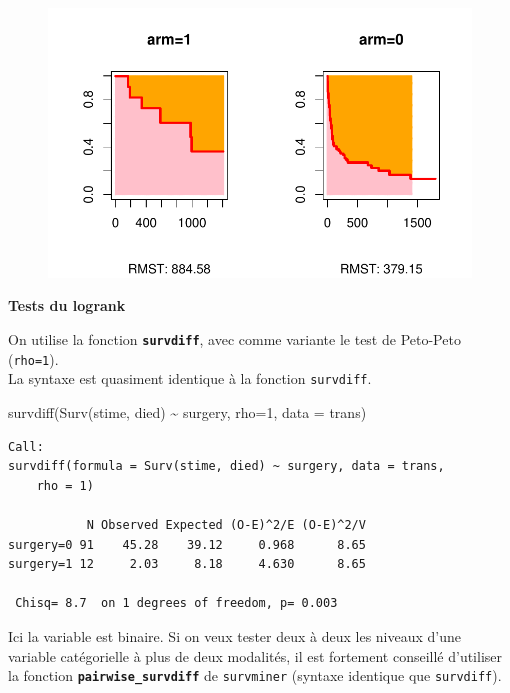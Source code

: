 \documentclass[
  12pt,
  letterpaper,
  DIV=11,
  numbers=noendperiod,
  onepage,
  openany]{scrreprt}
\newenvironment{Shaded}{\begin{snugshade}}{\end{snugshade}}
\newcommand{\AttributeTok}[1]{\textcolor[rgb]{0.80,0.80,0.80}{#1}}
\newcommand{\DecValTok}[1]{\textcolor[rgb]{0.86,0.86,0.80}{#1}}
\newcommand{\FunctionTok}[1]{\textcolor[rgb]{0.94,0.94,0.56}{#1}}
\newcommand{\NormalTok}[1]{\textcolor[rgb]{0.80,0.80,0.80}{#1}}
\newcommand{\SpecialCharTok}[1]{\textcolor[rgb]{0.86,0.64,0.64}{#1}}
\begin{document}
\begin{figure}[H]

{\centering \includegraphics{14-R_files/figure-pdf/unnamed-chunk-11-1.pdf}

}

\end{figure}

\textbf{Tests du logrank}

On utilise la fonction \textbf{\texttt{survdiff}}, avec comme variante
le test de Peto-Peto (\texttt{rho=1}).\\
La syntaxe est quasiment identique à la fonction \texttt{survdiff}.

\begin{Shaded}
\begin{Highlighting}[]
\FunctionTok{survdiff}\NormalTok{(}\FunctionTok{Surv}\NormalTok{(stime, died) }\SpecialCharTok{\textasciitilde{}}\NormalTok{ surgery, }\AttributeTok{rho=}\DecValTok{1}\NormalTok{, }\AttributeTok{data =}\NormalTok{ trans)}
\end{Highlighting}
\end{Shaded}

\begin{verbatim}
Call:
survdiff(formula = Surv(stime, died) ~ surgery, data = trans, 
    rho = 1)

           N Observed Expected (O-E)^2/E (O-E)^2/V
surgery=0 91    45.28    39.12     0.968      8.65
surgery=1 12     2.03     8.18     4.630      8.65

 Chisq= 8.7  on 1 degrees of freedom, p= 0.003 
\end{verbatim}

Ici la variable est binaire. Si on veux tester deux à deux les niveaux
d'une variable catégorielle à plus de deux modalités, il est fortement
conseillé d'utiliser la fonction \textbf{\texttt{pairwise\_survdiff}} de
\texttt{survminer} (syntaxe identique que \texttt{survdiff}).
\end{document}
